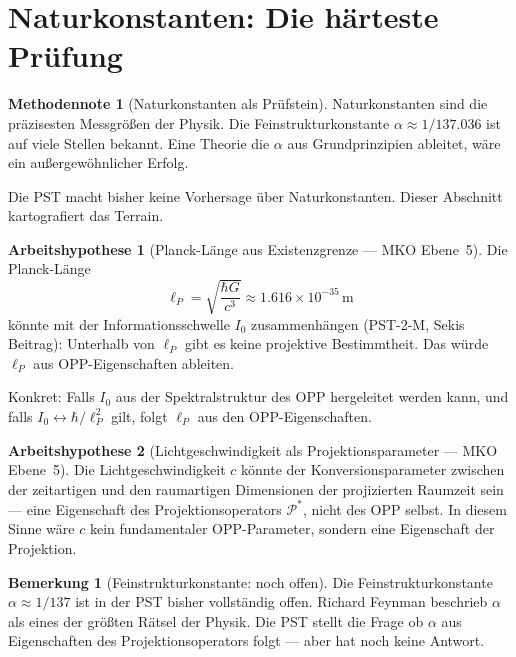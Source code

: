\documentclass[11pt,a4paper]{article}
\theoremstyle{plain}
\theoremstyle{definition}
\newtheorem{remark}{Bemerkung}[section]
\newtheorem{methodennote}{Methodennote}[section]
\newtheorem{hypothese}{Arbeitshypothese}[section]
\newcommand{\Proj}{\mathcal{P}}
\newcommand{\Lp}{\ell_P}
\begin{document}
\section{Naturkonstanten: Die h\"{a}rteste Pr\"{u}fung}

\begin{methodennote}[Naturkonstanten als Pr\"{u}fstein]
Naturkonstanten sind die pr\"{a}zisesten Messgr\"{o}\ss{}en der Physik.
Die Feinstrukturkonstante $\alpha \approx 1/137.036$ ist auf viele
Stellen bekannt. Eine Theorie die $\alpha$ aus Grundprinzipien ableitet,
w\"{a}re ein au\ss{}ergew\"{o}hnlicher Erfolg.

Die PST macht bisher keine Vorhersage \"{u}ber Naturkonstanten.
Dieser Abschnitt kartografiert das Terrain.
\end{methodennote}

\begin{hypothese}[Planck-L\"{a}nge aus Existenzgrenze --- MKO Ebene~5]
Die Planck-L\"{a}nge
\[
  \Lp = \sqrt{\frac{\hbar G}{c^3}} \approx 1.616 \times 10^{-35}\,\text{m}
\]
k\"{o}nnte mit der Informationsschwelle $I_0$ zusammenh\"{a}ngen
(PST-2-M, Sekis Beitrag): Unterhalb von $\Lp$ gibt es keine projektive
Bestimmtheit. Das w\"{u}rde $\Lp$ aus OPP-Eigenschaften ableiten.

Konkret: Falls $I_0$ aus der Spektralstruktur des OPP hergeleitet werden
kann, und falls $I_0 \leftrightarrow \hbar/\ell_P^2$ gilt, folgt $\ell_P$
aus den OPP-Eigenschaften.
\end{hypothese}

\begin{hypothese}[Lichtgeschwindigkeit als Projektionsparameter ---
MKO Ebene~5]
Die Lichtgeschwindigkeit $c$ k\"{o}nnte der Konversionsparameter
zwischen der zeitartigen und den raumartigen Dimensionen der
projizierten Raumzeit sein --- eine Eigenschaft des Projektionsoperators
$\Proj^\ast$, nicht des OPP selbst. In diesem Sinne w\"{a}re $c$ kein
fundamentaler OPP-Parameter, sondern eine Eigenschaft der Projektion.
\end{hypothese}

\begin{remark}[Feinstrukturkonstante: noch offen]
Die Feinstrukturkonstante $\alpha \approx 1/137$ ist in der PST bisher
vollst\"{a}ndig offen. Richard Feynman beschrieb $\alpha$ als eines der
gr\"{o}\ss{}ten R\"{a}tsel der Physik. Die PST stellt die Frage ob
$\alpha$ aus Eigenschaften des Projektionsoperators folgt --- aber
hat noch keine Antwort.
\end{remark}
\end{document}
